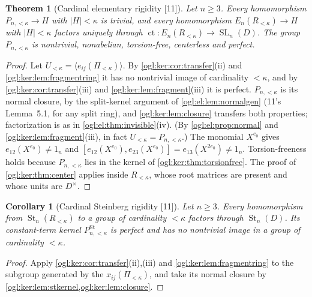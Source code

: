 \documentclass[11pt,oneside]{article}
\numberwithin{equation}{section}
\newtheorem{theorem}{Theorem}[section]
\newtheorem{corollary}[corollary]{Corollary}
\theoremstyle{definition}
\theoremstyle{remark}
\newcommand{\ct}{\operatorname{ct}}
\newcommand{\SL}{\operatorname{SL}}
\newcommand{\St}{\operatorname{St}}
\newcommand{\src}[1]{\textup{\textsf{\small[#1]}}}
\begin{document}
\begin{theorem}[Cardinal elementary rigidity \src{11}]\label{ogl:ker:thm:fragmentgroup}
Let $n\ge3$. Every homomorphism $P_{n,<\kappa}\to H$ with $|H|<\kappa$ is
trivial, and every homomorphism $E_n(R_{<\kappa})\to H$ with $|H|<\kappa$
factors uniquely through $\ct:E_n(R_{<\kappa})\to\SL_n(D)$. The group
$P_{n,<\kappa}$ is nontrivial, nonabelian, torsion-free, centerless and perfect.
\end{theorem}
\begin{proof}
Let $U_{<\kappa}=\langle e_{ij}(\Pi_{<\kappa})\rangle$. By
\cref{ogl:ker:cor:transfer}(ii) and \cref{ogl:ker:lem:fragmentring} it has no
nontrivial image of cardinality $<\kappa$, and by
\cref{ogl:ker:cor:transfer}(iii) and \cref{ogl:ker:lem:fragment}(iii) it is
perfect. $P_{n,<\kappa}$ is its normal closure, by the split-kernel argument of
\cref{ogl:el:lem:normalgen} (11's Lemma~5.1, for any split ring), and
\cref{ogl:ker:lem:closure} transfers both properties; factorization is as in
\cref{ogl:el:thm:invisible}(iv). (By \cref{ogl:el:prop:normal} and
\cref{ogl:ker:lem:fragment}(iii), in fact $U_{<\kappa}=P_{n,<\kappa}$.) The
monomial $X^{e_0}$ gives $e_{12}(X^{e_0})\ne1_n$ and
$[e_{12}(X^{e_0}),e_{23}(X^{e_0})]=e_{13}(X^{2e_0})\ne1_n$. Torsion-freeness holds
because $P_{n,<\kappa}$ lies in the kernel of \cref{ogl:ker:thm:torsionfree}. The
proof of \cref{ogl:ker:thm:center} applies inside $R_{<\kappa}$, whose root
matrices are present and whose units are $D^\times$.
\end{proof}

\begin{corollary}[Cardinal Steinberg rigidity \src{11}]\label{ogl:ker:cor:fragmentst}
Let $n\ge3$. Every homomorphism from $\St_n(R_{<\kappa})$ to a group of
cardinality $<\kappa$ factors through $\St_n(D)$. Its constant-term kernel
$P_{n,<\kappa}^{\St}$ is perfect and has no nontrivial image in a group of
cardinality $<\kappa$.
\end{corollary}
\begin{proof}
Apply \cref{ogl:ker:cor:transfer}(ii),(iii) and \cref{ogl:ker:lem:fragmentring}
to the subgroup generated by the $x_{ij}(\Pi_{<\kappa})$, and take its normal
closure by \cref{ogl:ker:lem:stkernel,ogl:ker:lem:closure}.
\end{proof}
\end{document}
